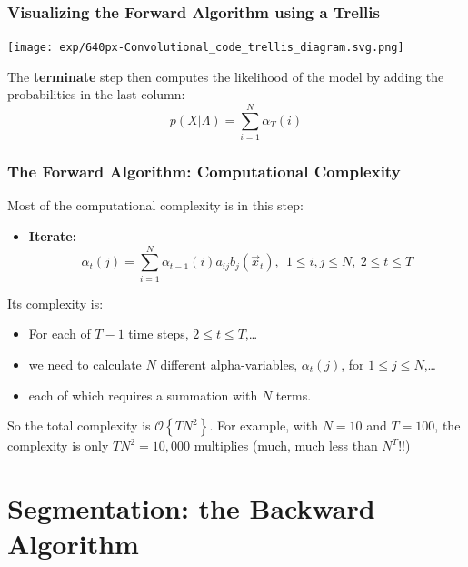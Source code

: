 \documentclass{beamer}
\begin{document}
\begin{frame}
  \frametitle{Visualizing the Forward Algorithm using a Trellis}

  \centerline{\texttt{[image: exp/640px-Convolutional\_code\_trellis\_diagram.svg.png]}}

  The {\bf terminate} step then computes the likelihood of the model
  by adding the probabilities in the last column:
  \[
  p(X|\Lambda) = \sum_{i=1}^N \alpha_T(i)
  \]
\end{frame}
  
\begin{frame}
  \frametitle{The Forward Algorithm: Computational Complexity}

  Most of the computational complexity is in this step:
  \begin{itemize}
  \item {\bf Iterate:}
    \[
    \alpha_{t}(j) = \sum_{i=1}^N \alpha_{t-1}(i) a_{ij}b_j(\vec{x}_t),~~1\le i,j\le N,~2\le t\le T
    \]
  \end{itemize}
  Its complexity is:
  \begin{itemize}
  \item For each of $T-1$ time steps, $2\le t\le T$,\ldots
  \item we need to calculate $N$ different alpha-variables, $\alpha_t(j)$, for $1\le j\le N$,\ldots
  \item each of which requires a summation with $N$ terms.
  \end{itemize}
  So the total complexity is ${\mathcal O}\left\{TN^2\right\}$.  For
  example, with $N=10$ and $T=100$, the complexity is only $TN^2=10,000$
  multiplies (much, much less than $N^T$!!)
\end{frame}

\section[Segmentation]{Segmentation: the Backward Algorithm}
\setcounter{subsection}{1}
\end{document}

